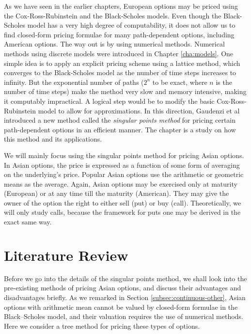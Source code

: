 

As we have seen in the earlier chapters, European options may be priced using the Cox-Ross-Rubinstein and the Black-Scholes models. Even though the Black-Scholes model has a very high degree of computability, it does not allow us to find closed-form pricing formulae for many path-dependent options, including American options. The way out is by using numerical methods. Numerical methods using discrete models were introduced in Chapter \ref{cha:models}. One simple idea is to apply an explicit pricing scheme using a lattice method, which converges to the Black-Scholes model as the number of time steps increases to infinity. But the exponential number of paths ($2^n$ to be exact, where $n$ is the number of time steps) make the method very slow and memory intensive, making it computably impractical. A logical step would be to modify the basic Cox-Ross-Rubinstein model to allow for approximations. In this direction, Gaudenzi et al\cite{Gaudenzi2010} introduced a new method called the \emph{singular points method} for pricing certain path-dependent options in an efficient manner. The chapter is a study on how this method and its applications.

We will mainly focus using the singular points method for pricing Asian options. In Asian options, the price is expressed as a function of some form of averaging on the underlying's price. Popular Asian options use the arithmetic or geometric means as the average. Again, Asian options may be exercised only at maturity (European) or at any time till the maturity (American). They may give the owner of the option the right to either sell (put) or buy (call). Theoretically, we will only study calls, because the framework for puts one may be derived in the exact same way.



\section{Literature Review}
\label{sec:asian-literature-review}

Before we go into the details of the singular points method, we shall look into the pre-existing methods of pricing Asian options, and discuss their advantages and disadvantages briefly. As we remarked in Section \ref{subsec:continuous-other}, Asian options with arithmetic mean cannot be valued by closed-form formulae in the Black–Scholes model, and their valuation requires the use of numerical methods. Here we consider a tree method for pricing these types of options.

